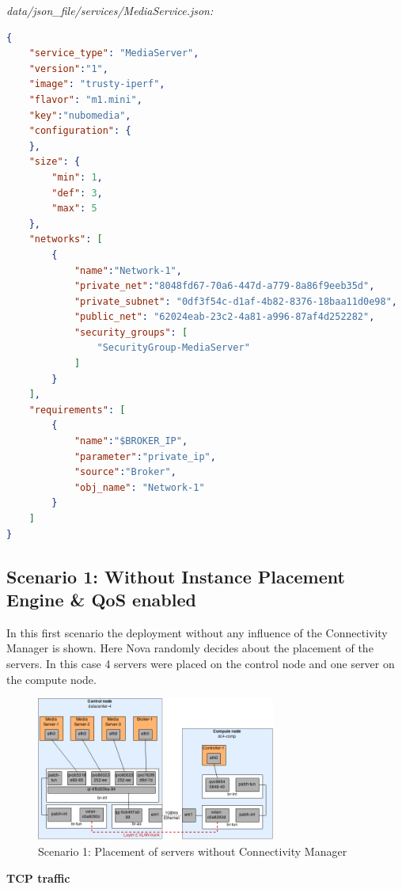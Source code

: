 \textit{data/json\_file/services/MediaService.json:}
\begin{lstlisting}[language=json,firstnumber=1]
{
    "service_type": "MediaServer",
    "version":"1",
    "image": "trusty-iperf",
    "flavor": "m1.mini",
    "key":"nubomedia",
    "configuration": {
    },
    "size": {
        "min": 1,
        "def": 3,
        "max": 5
    },
    "networks": [
        {
            "name":"Network-1",
            "private_net":"8048fd67-70a6-447d-a779-8a86f9eeb35d",
            "private_subnet": "0df3f54c-d1af-4b82-8376-18baa11d0e98",
            "public_net": "62024eab-23c2-4a81-a996-87af4d252282",
            "security_groups": [
                "SecurityGroup-MediaServer"
            ]
        }
    ],
    "requirements": [
        {
            "name":"$BROKER_IP",
            "parameter":"private_ip",
            "source":"Broker",
            "obj_name": "Network-1"
        }
    ]
}
\end{lstlisting}

\newpage
\subsection{Scenario 1: Without Instance Placement Engine \& QoS enabled}

In this first scenario the deployment without any influence of the Connectivity Manager is shown. Here Nova randomly decides about the placement of the servers. In this case 4 servers were placed on the control node and one server on the compute node.

\begin{figure}[H]
\centering

\includegraphics[width=0.7\textwidth]{images/evaluation/testbed_scenario1}

\caption{Scenario 1: Placement of servers without Connectivity Manager}
\end{figure}

\textbf{TCP traffic}

